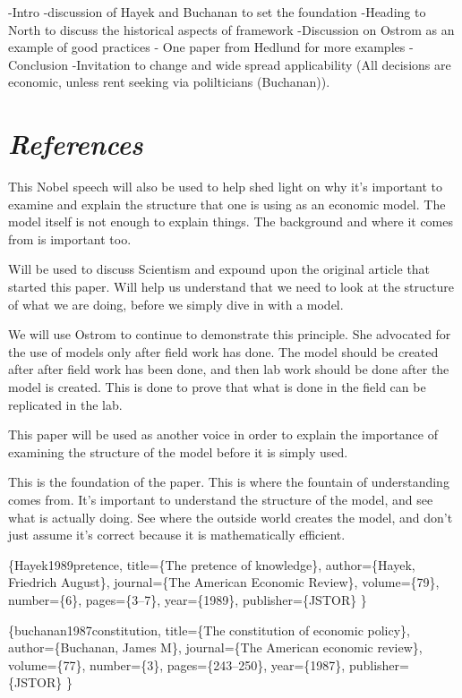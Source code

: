 \documentclass[11pt,]{article}
\begin{document}
-Intro -discussion of Hayek and Buchanan to set the foundation -Heading
to North to discuss the historical aspects of framework -Discussion on
Ostrom as an example of good practices - One paper from Hedlund for more
examples -Conclusion -Invitation to change and wide spread applicability
(All decisions are economic, unless rent seeking via polilticians
(Buchanan)).

\section{\texorpdfstring{\emph{References}}{References}}\label{references}

\citet{buchanan1987constitution} This Nobel speech will also be used to
help shed light on why it's important to examine and explain the
structure that one is using as an economic model. The model itself is
not enough to explain things. The background and where it comes from is
important too.

\citet{Hayek1989pretence} Will be used to discuss Scientism and expound
upon the original article that started this paper. Will help us
understand that we need to look at the structure of what we are doing,
before we simply dive in with a model.

\citet{ostrom2010beyond} We will use Ostrom to continue to demonstrate
this principle. She advocated for the use of models only after field
work has done. The model should be created after after field work has
been done, and then lab work should be done after the model is created.
This is done to prove that what is done in the field can be replicated
in the lab.

\citet{north1994economic} This paper will be used as another voice in
order to explain the importance of examining the structure of the model
before it is simply used.

\citet{buchanan1964should} This is the foundation of the paper. This is
where the fountain of understanding comes from. It's important to
understand the structure of the model, and see what is actually doing.
See where the outside world creates the model, and don't just assume
it's correct because it is mathematically efficient.

\citet{article}\{Hayek1989pretence, title=\{The pretence of knowledge\},
author=\{Hayek, Friedrich August\}, journal=\{The American Economic
Review\}, volume=\{79\}, number=\{6\}, pages=\{3--7\}, year=\{1989\},
publisher=\{JSTOR\} \}

\citet{article}\{buchanan1987constitution, title=\{The constitution of
economic policy\}, author=\{Buchanan, James M\}, journal=\{The American
economic review\}, volume=\{77\}, number=\{3\}, pages=\{243--250\},
year=\{1987\}, publisher=\{JSTOR\} \}
\end{document}
